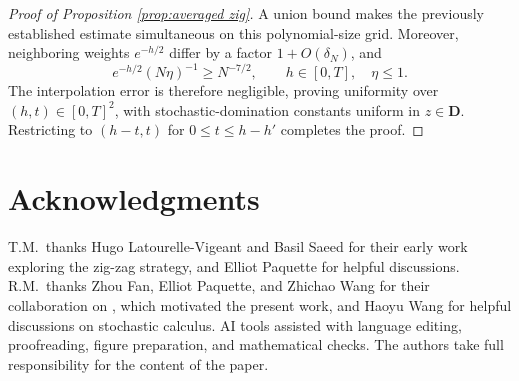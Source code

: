 \documentclass[11pt,reqno]{amsart}
\def\bD{\mathbf{D}}
\theoremstyle{definition}
\numberwithin{equation}{section}
\numberwithin{figure}{section}
\begin{document}
\begin{proof}[Proof of Proposition \ref{prop:averaged zig}]
A union bound makes the previously established estimate
simultaneous on this polynomial-size grid.
Moreover, neighboring weights $e^{-h/2}$ differ by a factor
$1+O(\delta_N)$, and
\[
    e^{-h/2}(N\eta)^{-1}\geq N^{-7/2},
    \qquad h\in[0,T],\quad \eta\leq1.
\]
The interpolation error is therefore negligible, proving
uniformity over $(h,t)\in[0,T]^2$, with stochastic-domination
constants uniform in $z\in\bD$.
Restricting to $(h-t,t)$ for $0\leq t\leq h-h'$ completes
the proof.
\end{proof}

\section*{Acknowledgments}

T.M.~thanks Hugo Latourelle-Vigeant and Basil Saeed for their
early work exploring the zig-zag strategy, and Elliot Paquette
for helpful discussions. R.M.~thanks Zhou Fan, Elliot Paquette,
and Zhichao Wang for their collaboration on
\cite{fan2026anisotropic}, which motivated the present work,
and Haoyu Wang for helpful discussions on stochastic calculus.
AI tools assisted with language editing, proofreading, figure
preparation, and mathematical checks. The authors take full
responsibility for the content of the paper.




\end{document}
